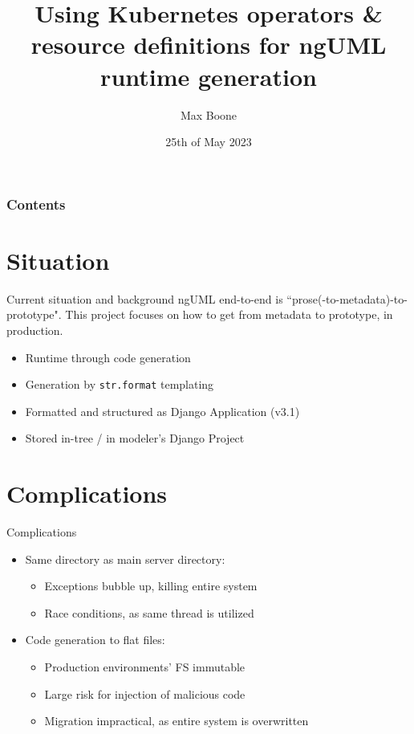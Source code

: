 \documentclass{beamer}
\title[CRDs for ngUML]{
    Using Kubernetes operators \& resource definitions
    for ngUML runtime generation 
}
\author{Max Boone}
\institute{LIACS}
\date{25th of May 2023}
\begin{document}
\frame{\titlepage}

\begin{frame}
    \frametitle{Contents}
    \tableofcontents
\end{frame} 

\section{Situation}

\begin{frame}{Current situation and background}
    ngUML end-to-end is ``prose(-to-metadata)-to-prototype". 
    This project focuses on how to get from metadata to prototype,
    in production.

    \begin{itemize}
        \item Runtime through code generation
        \item Generation by \texttt{str.format} templating
        \item Formatted and structured as Django Application (v3.1) 
        \item Stored in-tree / in modeler's Django Project
    \end{itemize}
\end{frame}

\section{Complications}

\begin{frame}{Complications}
    \begin{itemize}
        \item Same directory as main server directory: {
            \begin{itemize}
                \item Exceptions bubble up, killing entire system 
                \item Race conditions, as same thread is utilized
            \end{itemize}
        }
        \item Code generation to flat files: {
            \begin{itemize}
                \item Production environments' FS immutable
                \item Large risk for injection of malicious code
                \item Migration impractical, as entire system is overwritten
            \end{itemize} 
        }
    \end{itemize}
\end{frame}
\end{document}
